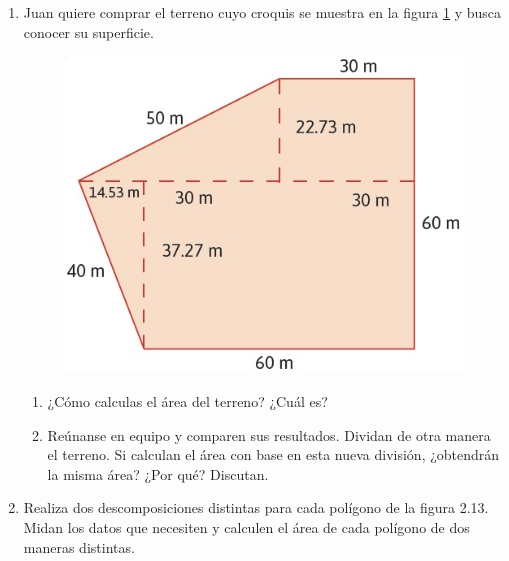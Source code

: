 \documentclass[11pt]{book}
\begin{document}
\begin{enumerate}
  \item Juan quiere comprar el terreno cuyo croquis se muestra en la figura \ref{fig:07} y busca conocer su superficie.

        \begin{minipage}[t]{0.35\textwidth}
          \begin{figure}[H]
            \centering
            \includegraphics[width=\linewidth]{07.jpg}
            \label{fig:07}
          \end{figure}
        \end{minipage}\hfill
        \begin{minipage}[t]{0.55\textwidth}
          \begin{enumerate}
            \item ¿Cómo calculas el área del terreno? ¿Cuál es?
            \item Reúnanse en equipo y comparen sus resultados. Dividan de otra manera el terreno. Si calculan el área con base en esta nueva división, ¿obtendrán la misma área? ¿Por qué? Discutan.
          \end{enumerate}
        \end{minipage}

  \item Realiza dos descomposiciones distintas para cada polígono de la figura 2.13. Midan los datos que necesiten y calculen el área de cada polígono de dos maneras distintas.


\end{enumerate}
\end{document}
